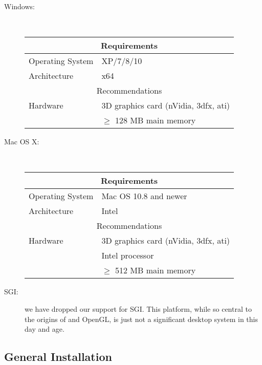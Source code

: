 \begin{description}
    \item [Windows: ] \mbox{}\\
          \begin{center}
          \begin{tabular}{|l|l|} \hline
            \multicolumn{2}{|c|}{Requirements} \\ \hline
              Operating System & XP/7/8/10\\
              Architecture & x64\\
              \hline
            \multicolumn{2}{|c|}{Recommendations} \\ \hline
            Hardware & 3D graphics card (nVidia, 3dfx, ati)\\
            & $\ge$ 128 MB main memory \\ \hline
          \end{tabular}
          \end{center}

    \item [Mac OS X: ] \mbox{}\\
          \begin{center}
          \begin{tabular}{|l|l|} \hline
            \multicolumn{2}{|c|}{Requirements} \\ \hline
              Operating System & Mac OS 10.8 and newer \\
              Architecture & Intel\\
              \hline
            \multicolumn{2}{|c|}{Recommendations} \\ \hline
            Hardware & 3D graphics card (nVidia, 3dfx, ati)\\
            & Intel processor \\
            & $\ge$ 512 MB main memory \\ \hline
          \end{tabular}
          \end{center}
          
   \item [SGI: ] we have dropped our support for SGI.  This platform, while
     so central to the origins of \map{} and OpenGL, is just not a
     significant desktop system in this day and age.  

  \end{description}
  
\subsection{General Installation}

